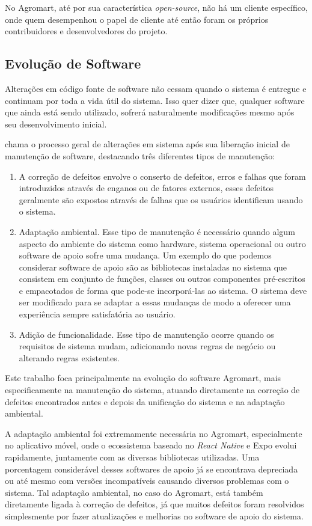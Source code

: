 No Agromart, até por sua característica \textit{open-source}, não há um cliente específico, onde quem desempenhou o papel de cliente até então foram os próprios contribuidores e desenvolvedores do projeto.

\subsection{Evolução de Software}
Alterações em código fonte de software não cessam quando o sistema é entregue e continuam por toda a vida útil do sistema. Isso quer dizer que, qualquer software que ainda está sendo utilizado, sofrerá naturalmente modificações mesmo após seu desenvolvimento inicial. 

\citeauthor{Sommerville2007} chama o processo geral de alterações em sistema após sua liberação inicial de manutenção de software, destacando três diferentes tipos de manutenção:

\begin{enumerate}
    \item A correção de defeitos envolve o conserto de defeitos, erros e falhas que foram introduzidos através de enganos ou de fatores externos, esses defeitos geralmente são expostos através de falhas que os usuários identificam usando o sistema.
    \item Adaptação ambiental. Esse tipo de manutenção é necessário quando algum aspecto do ambiente do sistema como hardware, sistema operacional ou outro software de apoio sofre uma mudança. Um exemplo do que podemos considerar software de apoio são as bibliotecas instaladas no sistema que consistem em conjunto de funções, classes ou outros componentes pré-escritos e empacotados de forma que pode-se incorporá-las ao sistema. O sistema deve ser modificado para se adaptar a essas mudanças de modo a oferecer uma experiência sempre satisfatória ao usuário.
    \item Adição de funcionalidade. Esse tipo de manutenção ocorre quando os requisitos de sistema mudam, adicionando novas regras de negócio ou alterando regras existentes.
\end{enumerate}

Este trabalho foca principalmente na evolução do software Agromart, mais especificamente na manutenção do sistema, atuando diretamente na correção de defeitos encontrados antes e depois da unificação do sistema e na adaptação ambiental.

A adaptação ambiental foi extremamente necessária no Agromart, especialmente no aplicativo móvel, onde o ecossistema baseado no \textit{React Native} e Expo evolui rapidamente, juntamente com as diversas bibliotecas utilizadas. Uma porcentagem considerável desses softwares de apoio já se encontrava depreciada ou até mesmo com versões incompatíveis causando diversos problemas com o sistema. Tal adaptação ambiental, no caso do Agromart, está também diretamente ligada à correção de defeitos, já que muitos defeitos foram resolvidos simplesmente por fazer atualizações e melhorias no software de apoio do sistema.

